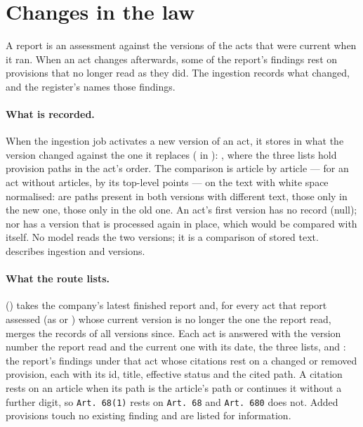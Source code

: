 \section{Changes in the law}\label{sec:register:law}

A report is an assessment against the versions of the acts that were current when it ran.
When an act changes afterwards, some of the report's findings rest on provisions that no
longer read as they did. The ingestion records what changed, and the register's
 names those findings.

\paragraph{What is recorded.} When the ingestion job activates a new version of an act, it
stores in  what the version changed against the one it
replaces ( in ): , where the three lists hold provision paths in the act's order. The comparison is
article by article --- for an act without articles, by its top-level points --- on the text
with white space normalised:  are paths present in both versions with different
text,  those only in the new one,  those only in the old one. An
act's first version has no record (null); nor has a version that is processed again in place,
which would be compared with itself. No model reads the two versions; it is a comparison
of stored text.  describes ingestion and versions.

\paragraph{What the route lists.} 
() takes the company's latest finished report and, for every act that report
assessed (as  or ) whose current version is no longer the one the
report read, merges the records of all versions since. Each act is answered with the version
number the report read and the current one with its date, the three lists, and
: the report's findings under that act whose citations rest on a changed or
removed provision, each with its id, title, effective status and the cited path. A citation
rests on an article when its path is the article's path or continues it without a further
digit, so \texttt{Art.\ 68(1)} rests on \texttt{Art.\ 68} and \texttt{Art.\ 680} does not. Added
provisions touch no existing finding and are listed for information.

